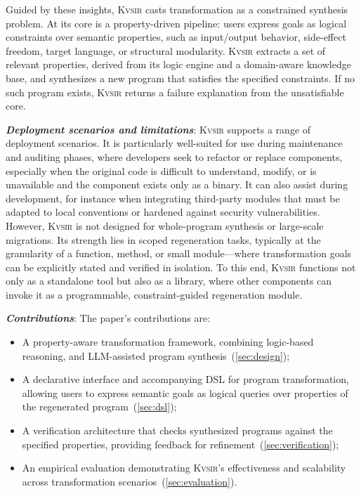 \documentclass[noacm,sigplan,review]{acmart}
\newcommand{\sys}{{\scshape Kv{\textalpha}sir}\xspace}
\newcommand{\heading}[1]{\vspace{2pt}\noindent\textbf{\emph{#1}}:\enspace}
\begin{document}
Guided by these insights, \sys casts transformation as a constrained synthesis problem.
At its core is a property-driven pipeline: users express goals as logical constraints over semantic properties, such as input/output behavior, side-effect freedom, target language, or structural modularity.
\sys extracts a set of relevant properties, derived from its logic engine and a domain-aware knowledge base, and synthesizes a new program that satisfies the specified constraints.
If no such program exists, \sys returns a failure explanation from the unsatisfiable core.

\heading{Deployment scenarios and limitations}
\sys supports a range of deployment scenarios.
It is particularly well-suited for use during maintenance and auditing phases, where developers seek to refactor or replace components, especially when the original code is difficult to understand, modify, or is unavailable and the component exists only as a binary.
It can also assist during development, for instance when integrating third-party modules that must be adapted to local conventions or hardened against security vulnerabilities.
However, \sys is not designed for whole-program synthesis or large-scale migrations.
Its strength lies in scoped regeneration tasks, typically at the granularity of a function, method, or small module---where transformation goals can be explicitly stated and verified in isolation.
To this end, \sys functions not only as a standalone tool but also as a
library, where other components can invoke it as a programmable,
constraint-guided regeneration module.


\heading{Contributions}
The paper's contributions are:
\begin{itemize}
  \item A property-aware transformation framework, combining logic-based reasoning, and LLM-assisted program synthesis~(\cref{sec:design});
 \item A declarative interface and accompanying DSL for program transformation, allowing users to express semantic goals as logical queries over properties of the regenerated program~(\cref{sec:dsl});
 \item A verification architecture that checks synthesized programs against the specified properties, providing feedback for refinement~(\cref{sec:verification});
 \item An empirical evaluation demonstrating \sys's effectiveness and scalability across transformation scenarios~(\cref{sec:evaluation}).
\end{itemize}
\end{document}

